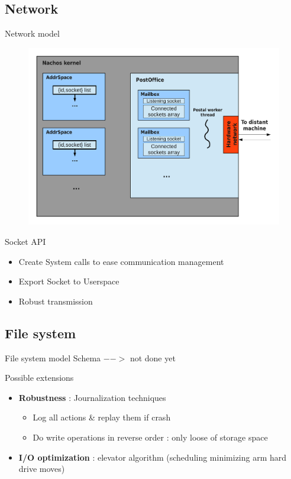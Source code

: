 \documentclass{beamer}
\begin{document}
\subsection{Network}
\begin{frame}{Network model}
    \begin{figure}[ht]
        \includegraphics[width=0.7\linewidth]{Networkcolored.pdf}
    \end{figure}
\end{frame}

\begin{frame}{Socket API}
    \begin{itemize}
        \item Create System calls to ease communication management
        \item Export Socket to Userspace 
        \item Robust transmission
    \end{itemize}
\end{frame}

\subsection{File system}
\begin{frame}{File system model}
    Schema $-->$ not done yet
\end{frame}

\begin{frame}{Possible extensions}
    \begin{itemize}
        \item \textbf{Robustness} : Journalization techniques
            \begin{itemize}
                \item Log all actions \& replay them if crash
                \item Do write operations in reverse order : only loose of
                    storage space
            \end{itemize}
        \item \textbf{I/O optimization} : elevator algorithm (scheduling minimizing arm
            hard drive moves)
    \end{itemize}
\end{frame}
\end{document}
